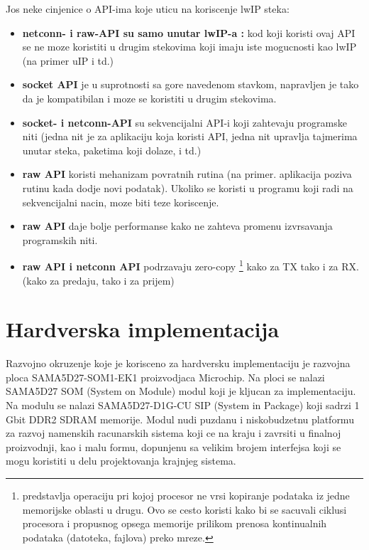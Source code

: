 \documentclass[a4paper,12pt, master]{etf}
\begin{document}
	Jos neke cinjenice o API-ima koje uticu na koriscenje lwIP steka:
	\begin{itemize}
		\item \textbf{netconn- i raw-API su samo unutar lwIP-a :} kod koji koristi ovaj API se 
		ne moze koristiti u drugim stekovima koji imaju iste mogucnosti kao lwIP (na primer 
		uIP i td.)
		\item \textbf{socket API} je u suprotnosti sa gore navedenom stavkom, napravljen je 
		tako da je kompatibilan i moze se koristiti u drugim stekovima.
		\item \textbf{socket- i netconn-API} su sekvencijalni API-i koji zahtevaju programske 
		niti (jedna nit je za aplikaciju koja koristi API, jedna nit upravlja tajmerima unutar 
		steka, paketima koji dolaze, i td.)
		\item \textbf{raw API} koristi mehanizam povratnih rutina (na primer. aplikacija poziva
		rutinu kada dodje novi podatak). Ukoliko se koristi u programu koji radi na 
		sekvencijalni nacin, moze biti teze koriscenje.
		\item \textbf{raw API} daje bolje performanse kako ne zahteva promenu izvrsavanja
		programskih niti.
		\item \textbf{raw API i netconn API} podrzavaju zero-copy \footnote{predstavlja 
		operaciju pri kojoj procesor ne vrsi kopiranje podataka iz jedne memorijske oblasti u 
		drugu. Ovo se cesto koristi kako bi se sacuvali ciklusi procesora i propusnog opsega 
		memorije prilikom prenosa kontinualnih podataka (datoteka, fajlova) preko mreze.} kako 
		za TX tako i za RX.	(kako za predaju, tako i za prijem)
	\end{itemize}

	\newpage

	\chapter{Hardverska implementacija}

	Razvojno okruzenje koje je korisceno za hardversku implementaciju je razvojna ploca
	SAMA5D27-SOM1-EK1 proizvodjaca Microchip. Na ploci se nalazi SAMA5D27 SOM (System on 
	Module) modul koji je kljucan za implementaciju. Na modulu se nalazi SAMA5D27-D1G-CU SIP 
	(System in Package) koji sadrzi 1 Gbit DDR2 SDRAM memorije. Modul nudi puzdanu i 
	niskobudzetnu platformu	za razvoj namenskih racunarskih sistema koji ce na kraju i 
	zavrsiti u finalnoj proizvodnji, kao i malu formu, dopunjenu sa velikim brojem interfejsa 
	koji se mogu koristiti u delu projektovanja krajnjeg sistema.
\end{document}
